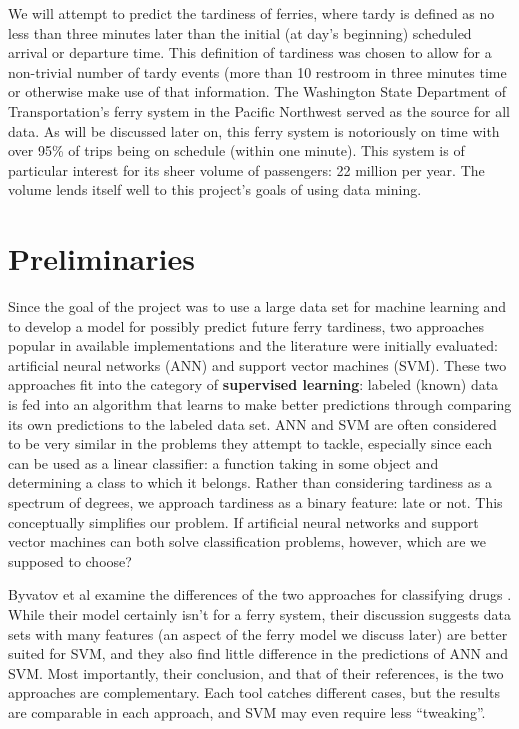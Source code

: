 \documentclass[11pt]{article} %
\begin{document}
We will attempt to predict the tardiness of ferries, where tardy is 
defined as no less than three minutes later than the
initial (at day's beginning) scheduled arrival or departure time. This definition
of tardiness was chosen to allow for a non-trivial number of tardy events 
(more than 10%
restroom in three minutes time or otherwise make use of that information. The 
Washington State Department of Transportation's ferry system in the Pacific
Northwest served as the source for all data. As will be discussed later on, 
this ferry system is notoriously on time with over 95\% of trips being on 
schedule (within one minute). %
This system is of particular interest for its sheer volume of passengers: 
22 million per year. %
The volume lends itself well to this project's goals of using data mining. 



\section{Preliminaries}
\label{sec:prelims}
Since the goal of the project was to use a large data set for machine learning 
and to develop a model for possibly predict future ferry tardiness, two approaches
popular in available implementations and the literature were initially evaluated:
artificial neural networks (ANN) and support vector machines (SVM). These two 
approaches fit into the
category of \textbf{supervised learning}: labeled (known) data is fed into an
algorithm that learns to make better predictions through comparing its own 
predictions to the labeled data set. ANN and SVM are often considered to be
very similar in the problems they attempt to tackle, especially since each can
be used as a linear classifier: a function taking in some object and determining 
a class to which it belongs. Rather than considering tardiness as a spectrum of
degrees, we approach tardiness as a binary feature: late or not. This conceptually
simplifies our problem.  
If artificial neural networks and support vector 
machines can both solve classification problems, however, which are we supposed
to choose?

Byvatov et al examine the differences of the two approaches for classifying drugs
\cite{byvatov2003comparison}. While their model certainly isn't for a ferry 
system, their discussion suggests data sets with many features (an aspect of the 
ferry model we discuss later) are better suited for SVM, and they also find little
difference in the predictions of ANN and SVM. Most importantly, their conclusion,
and that of their references, is the two approaches are complementary. Each 
tool catches different cases, but the results are comparable in each approach,
and SVM may even require less ``tweaking''.
\end{document}

